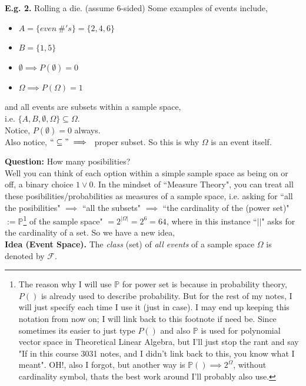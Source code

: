 \documentclass[12pt]{book}
\begin{document}
\noindent\textbf{E.g. 2. } Rolling a die. (assume 6-sided)
Some examples of events include, 
\begin{itemize}
\item $A = \{ even~\#'s \} = \{ 2,4,6 \}$
\item $B = \{ 1,5 \}$
\item $\emptyset \implies P(\emptyset) = 0$
\item$\Omega \implies P(\Omega) = 1$
\end{itemize}
and all events are subsets within a sample space,\\
i.e. $\{ A,B,\emptyset, \Omega \} \subseteq \Omega$.\\

\noindent Notice, $P(\emptyset)=0$ always. \\
Also notice, $``\subseteq" \implies{}$ proper subset. So this is why $\Omega$ is an event itself.

\noindent \textbf{Question: } How many posibilities?\\
Well you can think of each option within a simple sample space as being on or off, a binary choice ${1 \lor 0}$. 
In the mindset of ``Measure Theory", you can treat all these posibilities/probabilities as measures of a sample space, i.e. asking for ``all the posibilities" $\implies{}$ ``all the subsets" $\implies{}$ 
``the cardinality of the (power set)"$:=\mathbb{P}$\footnote{The reason why I will use $\mathbb{P}$ for power set is because in probability theory, $P()$ is already used to describe probability. But for the rest of my notes, I will just specify each time I use it (just in case). I may end up keeping this notation from now on; I will link back to this footnote if need be. Since sometimes its easier to just type $P()$ and also $\mathbb{P}$ is used for polynomial vector space in Theoretical Linear Algebra, but I'll just stop the rant and say "If in this course 3031 notes, and I didn't link back to this, you know what I meant". OH!, also I forgot, but another way is $\mathbb{P}() \implies 2^{\Omega}$, without cardinality symbol, thats the best work around I'll probably also use.
} of the sample space" $=2^{|\Omega|}=2^6=64$, where in this instance ``$||$" asks for the cardinality of a set. 
So we have a new idea, \\

\noindent \textbf{Idea (Event Space). } The \textit{class} (set) of \textit{all events} of a sample space $\Omega$ is denoted by $\mathcal{F}$.\\
\end{document}
